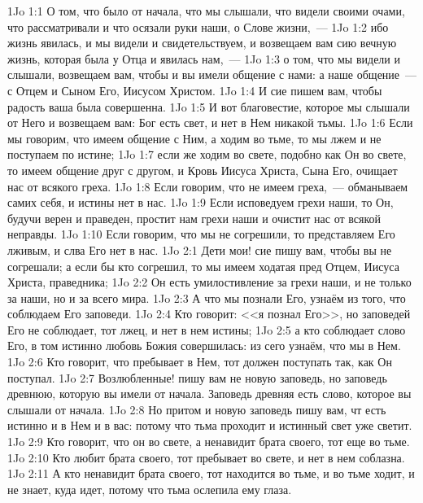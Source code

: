 \vs 1Jo 1:1 О том, что было от начала, что мы слышали, что видели своими очами, что рассматривали и что осязали руки наши, о Слове жизни,~---
\vs 1Jo 1:2 ибо жизнь явилась, и мы видели и свидетельствуем, и возвещаем вам сию вечную жизнь, которая была у Отца и явилась нам,~---
\vs 1Jo 1:3 о том, что мы видели и слышали, возвещаем вам, чтобы и вы имели общение с нами: а наше общение~--- с Отцем и Сыном Его, Иисусом Христом.
\vs 1Jo 1:4 И сие пишем вам, чтобы радость ваша была совершенна.
\rsbpar\vs 1Jo 1:5 И вот благовестие, которое мы слышали от Него и возвещаем вам: Бог есть свет, и нет в Нем никакой тьмы.
\vs 1Jo 1:6 Если мы говорим, что имеем общение с Ним, а ходим во тьме, то мы лжем и не поступаем по истине;
\vs 1Jo 1:7 если же ходим во свете, подобно как Он во свете, то имеем общение друг с другом, и Кровь Иисуса Христа, Сына Его, очищает нас от всякого греха.
\vs 1Jo 1:8 Если говорим, что не имеем греха,~--- обманываем самих себя, и истины нет в нас.
\vs 1Jo 1:9 Если исповедуем грехи наши, то Он, будучи верен и праведен, простит нам грехи наши и очистит нас от всякой неправды.
\vs 1Jo 1:10 Если говорим, что мы не согрешили, то представляем Его лживым, и слва Его нет в нас.
\vs 1Jo 2:1 Дети мои! сие пишу вам, чтобы вы не согрешали; а если бы кто согрешил, то мы имеем ходатая пред Отцем, Иисуса Христа, праведника;
\vs 1Jo 2:2 Он есть умилостивление за грехи наши, и не только за наши, но и за  всего мира.
\rsbpar\vs 1Jo 2:3 А что мы познали Его, узнаём из того, что соблюдаем Его заповеди.
\vs 1Jo 2:4 Кто говорит: <<я познал Его>>, но заповедей Его не соблюдает, тот лжец, и нет в нем истины;
\vs 1Jo 2:5 а кто соблюдает слово Его, в том истинно любовь Божия совершилась: из сего узнаём, что мы в Нем.
\vs 1Jo 2:6 Кто говорит, что пребывает в Нем, тот должен поступать так, как Он поступал.
\rsbpar\vs 1Jo 2:7 Возлюбленные! пишу вам не новую заповедь, но заповедь древнюю, которую вы имели от начала. Заповедь древняя есть слово, которое вы слышали от начала.
\vs 1Jo 2:8 Но притом и новую заповедь пишу вам, чт есть истинно и в Нем и в вас: потому что тьма проходит и истинный свет уже светит.
\vs 1Jo 2:9 Кто говорит, что он во свете, а ненавидит брата своего, тот еще во тьме.
\vs 1Jo 2:10 Кто любит брата своего, тот пребывает во свете, и нет в нем соблазна.
\vs 1Jo 2:11 А кто ненавидит брата своего, тот находится во тьме, и во тьме ходит, и не знает, куда идет, потому что тьма ослепила ему глаза.
